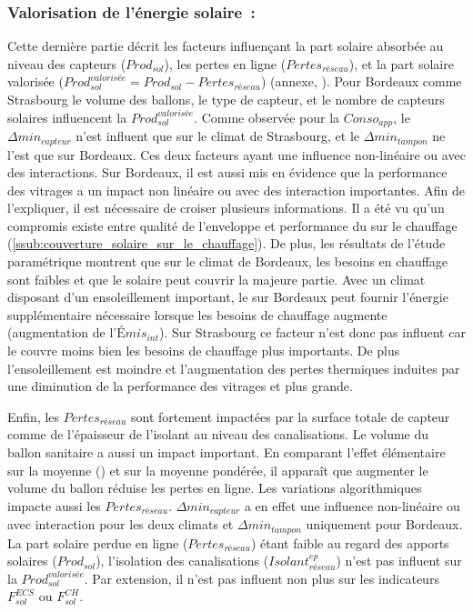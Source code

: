 \subsubsection{Valorisation de l’énergie solaire~:} %
\label{ssub:valorisation_de_l_energie_solaire}
Cette dernière partie décrit les facteurs influençant la part solaire absorbée
au niveau des capteurs ($Prod_{sol}$), les pertes en ligne ($Pertes_{réseau}$),
et la part solaire valorisée ($Prod_{sol}^{valorisée} = Prod_{sol} - Pertes_{réseau}$)
(annexe, ).
Pour Bordeaux comme Strasbourg le volume des ballons, le type de capteur, et le
nombre de capteurs solaires influencent la $Prod_{sol}^{valorisée}$.
Comme observée pour la $Conso_{app}$, le $\Delta min_{capteur}$ n’est influent
que sur le climat de Strasbourg, et le $\Delta min_{tampon}$ ne l’est que sur Bordeaux. Ces deux
facteurs ayant une influence non-linéaire ou avec des interactions.
Sur Bordeaux, il est aussi mis en évidence que la performance des vitrages a un impact
non linéaire ou avec des interaction importantes. Afin de l’expliquer, il est nécessaire
de croiser plusieurs informations. Il a été vu qu’un compromis existe entre qualité
de l’enveloppe et performance du  sur le chauffage (\ref{ssub:couverture_solaire_sur_le_chauffage}).
De plus, les résultats de l’étude paramétrique montrent que sur le climat de Bordeaux,
les besoins en chauffage sont faibles et que le solaire peut couvrir la majeure partie.
Avec un climat disposant d’un ensoleillement important, le  sur Bordeaux
peut fournir l’énergie supplémentaire nécessaire lorsque les besoins de chauffage
augmente (augmentation de l’$Émis_{int}$). Sur Strasbourg ce facteur n’est donc
pas influent car le  couvre moins bien les besoins de chauffage plus importants.
De plus l’ensoleillement est moindre et l’augmentation des pertes thermiques induites
par une diminution de la performance des vitrages et plus grande.

Enfin, les $Pertes_{réseau}$ sont fortement impactées par la surface totale de capteur
comme de l’épaisseur de l’isolant au niveau des canalisations. Le volume du ballon
sanitaire a aussi un impact important. En comparant l’effet élémentaire sur la moyenne
() et sur la moyenne pondérée, il apparaît que augmenter
le volume du ballon réduise les pertes en ligne. Les variations algorithmiques impacte
aussi les $Pertes_{réseau}$. $\Delta min_{capteur}$ a en effet une influence non-linéaire
ou avec interaction pour les deux climats et $\Delta min_{tampon}$ uniquement pour
Bordeaux. La part solaire perdue en ligne ($Pertes_{réseau}$) étant faible au regard des
apports solaires ($Prod_{sol}$), l’isolation des canalisations ($Isolant_{réseau}^{ep}$)
n’est pas influent sur la $Prod_{sol}^{valorisée}$. Par extension, il n’est pas influent
non plus sur les indicateurs $F_{sol}^{ECS}$ ou $F_{sol}^{CH}$.


